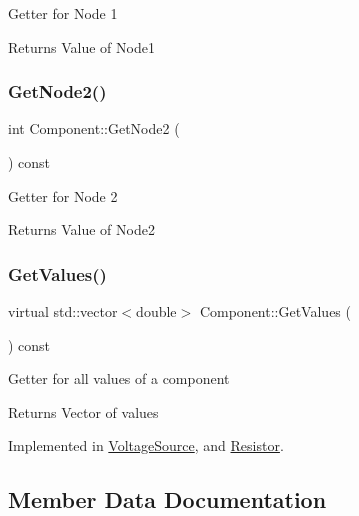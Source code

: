 Getter for Node 1 \begin{DoxyReturn}{Returns}
Value of Node1 
\end{DoxyReturn}
\mbox{\label{classComponent_aac8e1e6f5ecd3529912bd4afa0903921}} 
\subsubsection{\texorpdfstring{Get\+Node2()}{GetNode2()}}
{\footnotesize\ttfamily int Component\+::\+Get\+Node2 (\begin{DoxyParamCaption}{ }\end{DoxyParamCaption}) const\hspace{0.3cm}{\ttfamily [inline]}}

Getter for Node 2 \begin{DoxyReturn}{Returns}
Value of Node2 
\end{DoxyReturn}
\mbox{\label{classComponent_a7c6ba16177143bc9945583a9c3df4c89}} 
\subsubsection{\texorpdfstring{Get\+Values()}{GetValues()}}
{\footnotesize\ttfamily virtual std\+::vector$<$double$>$ Component\+::\+Get\+Values (\begin{DoxyParamCaption}{ }\end{DoxyParamCaption}) const\hspace{0.3cm}{\ttfamily [pure virtual]}}

Getter for all values of a component \begin{DoxyReturn}{Returns}
Vector of values 
\end{DoxyReturn}


Implemented in \hyperlink{classVoltageSource_a60bb1c5c07f668854a817d626f220f84}{Voltage\+Source}, and \hyperlink{classResistor_ad4d08c34efa99287438aac338d7012d7}{Resistor}.



\subsection{Member Data Documentation}
\mbox{\label{classComponent_a46343549452bda5ee9752f7a9bc15efb}} 

